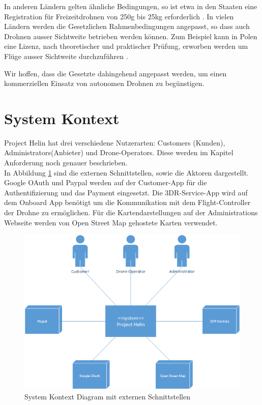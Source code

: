 In anderen Ländern gelten ähnliche Bedingungen, so ist etwa in den Staaten eine Registration für Freizeitdrohnen von 250g bis 25kg erforderlich \cite[Seite 26]{pwc-drone}.
In vielen Ländern werden die Gesetzlichen Rahmenbedingungen angepasst, so dass auch Drohnen ausser Sichtweite betrieben werden können.
Zum Beispiel kann in Polen eine Lizenz, nach theoretischer und praktischer Prüfung, erworben werden um Flüge ausser Sichtweite durchzuführen \cite[Seite 21]{pwc-drone}.

Wir hoffen, dass die Gesetzte dahingehend angepasst werden, um einen kommerziellen Einsatz von autonomen Drohnen zu begünstigen. 

\section{System Kontext}

Project Helin hat drei verschiedene Nutzerarten: Customers (Kunden), Administrators(Anbieter) und Drone-Operators. Diese werden im Kapitel Anforderung noch genauer beschrieben.\\

In Abbildung \ref{fig:system-context-diagram} sind die externen Schnittstellen, sowie die Aktoren dargestellt. Google OAuth und Paypal werden auf der Customer-App für die Authentifizierung und das Payment eingesetzt. Die 3DR-Service-App wird auf dem Onboard App benötigt um die Kommunikation mit dem Flight-Controller der Drohne zu ermöglichen. Für die Kartendarstellungen auf der Administrations Webseite werden von Open Street Map gehostete Karten verwendet.


\begin{figure}[h]
\includegraphics[width=1.0\textwidth]{images/system-context-diagram.png}
\caption{System Kontext Diagram mit externen Schnittstellen }
\label{fig:system-context-diagram}
\end{figure}









